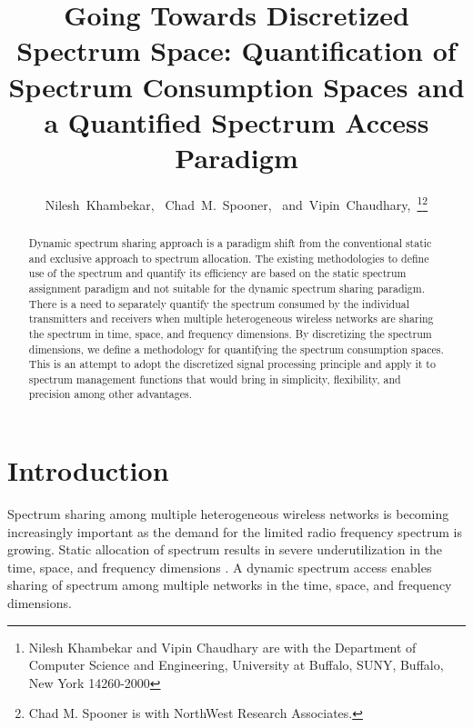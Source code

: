 \documentclass[journal,12pt,draftclsnofoot,onecolumn]{IEEEtran}
\begin{document}
\title{Going Towards Discretized Spectrum Space: Quantification of Spectrum Consumption Spaces and a Quantified Spectrum Access Paradigm}

\author{Nilesh~Khambekar,~
        Chad~M.~Spooner,~
        and~Vipin~Chaudhary,~\thanks{Nilesh Khambekar and Vipin Chaudhary are with the Department of Computer Science and Engineering, University at Buffalo, SUNY, Buffalo, New York 14260-2000}\thanks{Chad M. Spooner is with NorthWest Research Associates.}}






\maketitle

\begin{abstract}
Dynamic spectrum sharing approach is a paradigm shift from the conventional static and exclusive approach to spectrum allocation. The existing methodologies to define use of the spectrum and quantify its efficiency are based on the static spectrum assignment paradigm and not suitable for the dynamic spectrum sharing paradigm. There is a need to separately quantify the spectrum consumed by the individual transmitters and receivers when multiple heterogeneous wireless networks are sharing the spectrum in time, space, and frequency dimensions. By discretizing the spectrum dimensions, we define a methodology for quantifying the spectrum consumption spaces. This is an attempt to adopt the discretized signal processing principle and apply it to spectrum management functions that would bring in simplicity, flexibility, and precision among other advantages.
\end{abstract}



\IEEEpeerreviewmaketitle





\section{Introduction}


Spectrum sharing among multiple heterogeneous wireless networks is becoming increasingly important as the demand for the limited radio frequency spectrum is growing. Static allocation of spectrum results in severe underutilization in the time, space, and frequency dimensions \cite{fcc_sptf}. A dynamic spectrum access enables sharing of spectrum among multiple networks in the time, space, and frequency dimensions. 
\end{document}
